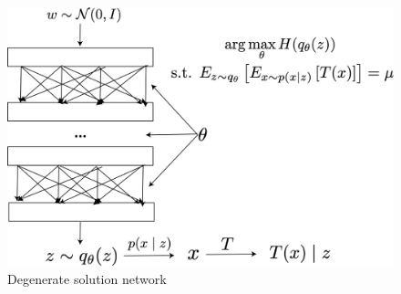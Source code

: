 \documentclass[12pt]{article}
\begin{document}
\vspace{-4pt}
\noindent\makebox[\linewidth]{\rule{\columnwidth}{0.4pt}}
\setlength{\abovecaptionskip}{-3mm}
\begin{figure}
  \begin{center}  
\includegraphics[scale=.3]{images/CosyneAbstract/DSN.png} 
\end{center}
 \caption{\label{fig:fig1} Degenerate solution network}\end{figure}
 
\end{document}
